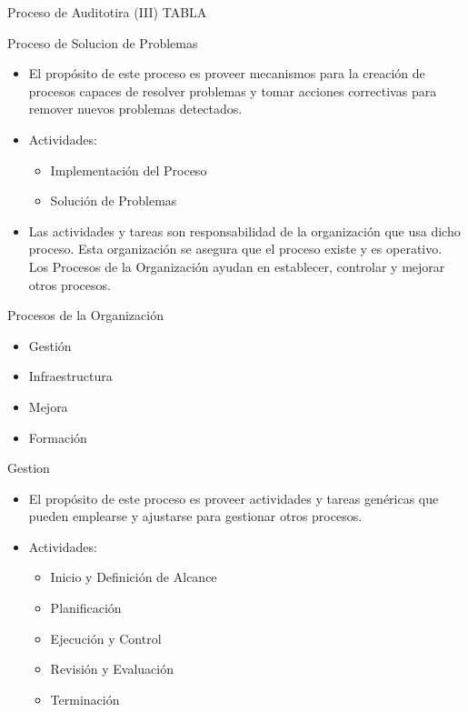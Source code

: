 \documentclass{beamer}
\begin{document}
			\begin{frame}{Proceso de Auditotira (III)}
				\huge TABLA
			\end{frame}
			
			\begin{frame}{Proceso de Solucion de Problemas}
				\begin{itemize}
					\item El propósito de este proceso es proveer mecanismos para la creación de procesos capaces de resolver problemas y tomar acciones correctivas para remover nuevos problemas detectados.
					\item Actividades:
			
						\begin{itemize}
							\item Implementación del Proceso
							\item Solución de Problemas
						\end{itemize}

				\end{itemize}			 
			\end{frame}
			
			\begin{frame}
				\begin{itemize}
					\item Las actividades y tareas son responsabilidad de la organización que usa dicho proceso. Esta organización se asegura que el proceso existe y es operativo. Los Procesos de la Organización ayudan en establecer, controlar y mejorar otros procesos.
				\end{itemize}
			\end{frame}
			
			\begin{frame}{Procesos de la Organización}
				\begin{itemize}
					\item Gestión
					\item Infraestructura
					\item Mejora
					\item Formación
				\end{itemize}
			\end{frame}
			
			\begin{frame}{Gestion}
				\begin{itemize}
					\item El propósito de este proceso es proveer actividades y tareas genéricas que pueden emplearse y ajustarse para gestionar otros procesos.
					\item Actividades:
					
					\begin{itemize}
						\item Inicio y Definición de Alcance
						\item Planificación
						\item Ejecución y Control
						\item Revisión y Evaluación
						\item Terminación
					\end{itemize}
				\end{itemize}
			\end{frame}
			
\end{document}
